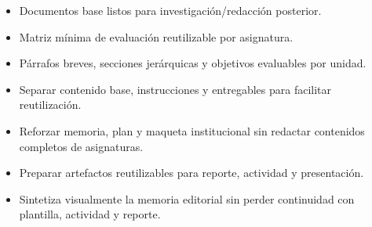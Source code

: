 \documentclass[12pt]{article}
\begin{document}
\begin{itemize}[leftmargin=*]
  \item Documentos base listos para investigación/redacción posterior.
  \item Matriz mínima de evaluación reutilizable por asignatura.
  \item Párrafos breves, secciones jerárquicas y objetivos evaluables por unidad.
  \item Separar contenido base, instrucciones y entregables para facilitar reutilización.
  \item Reforzar memoria, plan y maqueta institucional sin redactar contenidos completos de asignaturas.
  \item Preparar artefactos reutilizables para reporte, actividad y presentación.
  \item Sintetiza visualmente la memoria editorial sin perder continuidad con plantilla, actividad y reporte.
\end{itemize}
\end{document}
